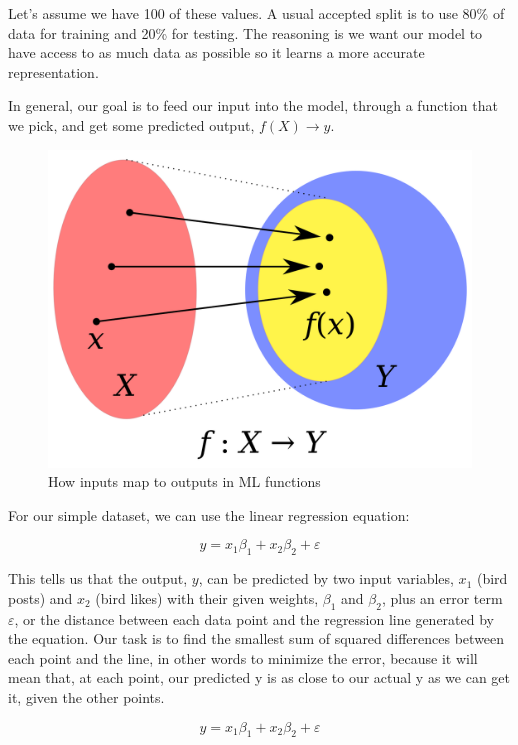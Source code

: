 \documentclass[11pt, table]{diazessay} %
\begin{document}
\begin{sloppypar}
Let's assume we have 100 of these values.  A usual accepted split is to use 80\% of data for training and 20\% for testing. The reasoning is we want our model to have access to as much data as possible so it learns a more accurate representation.

In general, our goal is to feed our input into the model, through a function that we pick, and get some predicted output, $f(X) \rightarrow y$.

\begin{figure}[H]
  \includegraphics[width=.8\linewidth]{figures/function.png}
  \caption{How inputs map to outputs in ML functions  \citep{klein2013coding}}
\end{figure}

For our simple dataset, we can use the linear regression equation:

\begin{equation}
y = x_1\beta_1 + x_2\beta_2 + \varepsilon
\end{equation}

This tells us that the output, $y$, can be predicted by two input variables, $x_1$ (bird posts) and $x_2$ (bird likes) with their given weights, $\beta_1$ and $\beta_2$, plus an error term $\varepsilon$, or the distance between each data point and the regression line generated by the equation. Our task is to find the smallest sum of squared differences between each point and the line, in other words to minimize the error, because it will mean that, at each point, our predicted y is as close to our actual y as we can get it, given the other points.

\begin{equation}
y = x_1\beta_1 + x_2\beta_2 + \varepsilon
\end{equation}


\end{sloppypar}
\end{document}
